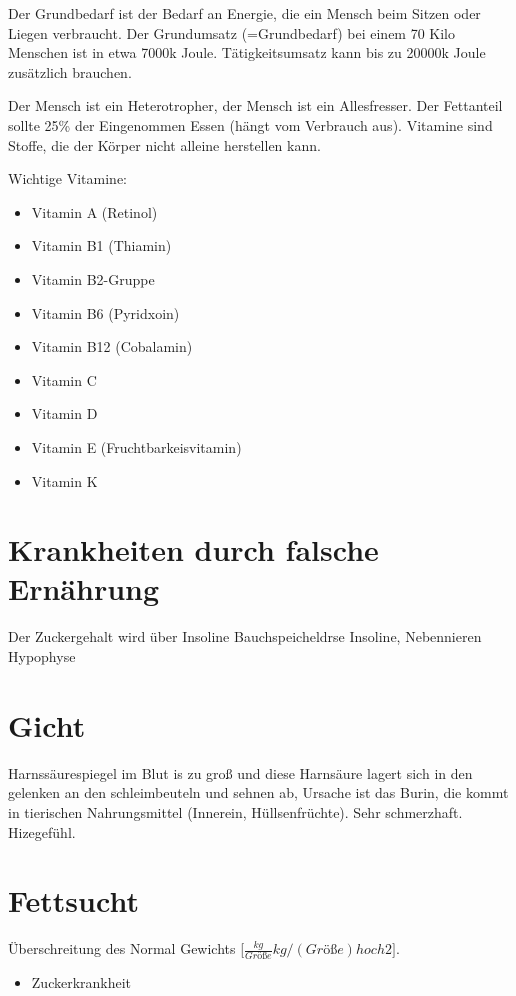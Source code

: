 \documentclass[a4paper]{article}
\begin{document}
Der Grundbedarf ist der Bedarf an Energie, die ein Mensch beim Sitzen oder Liegen verbraucht. Der Grundumsatz (=Grundbedarf) bei einem 70 Kilo Menschen ist in etwa 7000k Joule. Tätigkeitsumsatz kann bis zu 20000k Joule zusätzlich brauchen.

Der Mensch ist ein Heterotropher, der Mensch ist ein Allesfresser. Der Fettanteil sollte 25\% der Eingenommen Essen (hängt vom Verbrauch aus). Vitamine sind Stoffe, die der Körper nicht alleine herstellen kann.

Wichtige Vitamine:

\begin{itemize}
\item Vitamin A (Retinol)
\item Vitamin B1 (Thiamin)
\item Vitamin B2-Gruppe 
\item Vitamin B6 (Pyridxoin)
\item Vitamin B12 (Cobalamin)
\item Vitamin C
\item Vitamin D
\item Vitamin E (Fruchtbarkeisvitamin)
\item Vitamin K
\end{itemize}

\section{Krankheiten durch falsche Ernährung}

Der Zuckergehalt wird über Insoline
Bauchspeicheldrse Insoline, Nebennieren Hypophyse 

\section{Gicht}

Harnssäurespiegel im Blut is zu groß und diese Harnsäure lagert sich in den gelenken an den schleimbeuteln und sehnen ab, Ursache ist das Burin, die kommt in tierischen Nahrungsmittel (Innerein, Hüllsenfrüchte). Sehr schmerzhaft. Hizegefühl. 

\section{Fettsucht}

Überschreitung des Normal Gewichts [$\frac{kg}{Größe}kg/(Größe)hoch2]. $

\begin{itemize}
\item Zuckerkrankheit 
\end{itemize}
\end{document}
